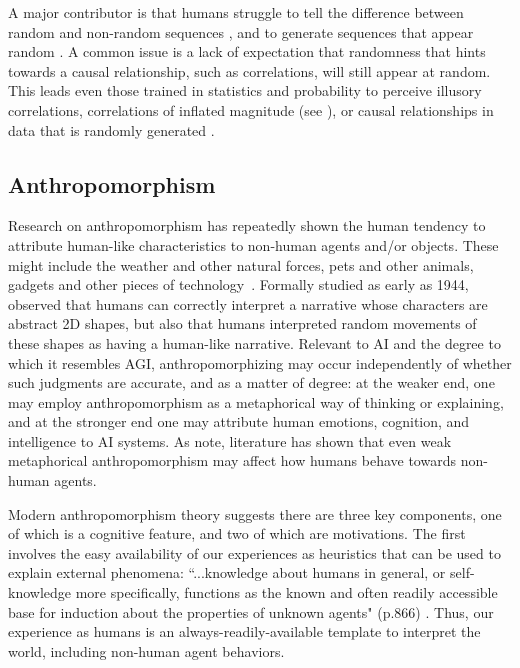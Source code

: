 A major contributor is that humans struggle to tell the difference between random and non-random sequences \citep{falk1997making}, and to generate sequences that appear random \citep{ladouceur1996erroneous}. A common issue is a lack of expectation that randomness that hints towards a causal relationship, such as correlations, will still appear at random. This leads even those trained in statistics and probability to perceive illusory correlations, correlations of inflated magnitude (see \citet{nickerson1998confirmation}), or causal relationships in data that is randomly generated \citep{zgraggen2018investigating}.

\subsection{Anthropomorphism}

Research on anthropomorphism has repeatedly shown the human tendency to attribute human-like characteristics to non-human agents and/or objects. These might include the weather and other natural forces, pets and other animals, gadgets and other pieces of technology~\citep{epley2007seeing}. Formally studied as early as 1944,~\citep{heider1944experimental} observed that humans can correctly interpret a narrative whose characters are abstract 2D shapes, but also that humans interpreted random movements of these shapes as having a human-like narrative. 
Relevant to AI and the degree to which it resembles AGI, anthropomorphizing may occur independently of whether such judgments are accurate, and as a matter of degree: at the weaker end, one may employ anthropomorphism as a metaphorical way of thinking or explaining, and at the stronger end one may attribute human emotions, cognition, and intelligence to AI systems. As \citet{epley2007seeing} note, literature has shown that even weak metaphorical anthropomorphism may affect how humans behave towards non-human agents.

Modern anthropomorphism theory suggests there are three key components, one of which is a cognitive feature, and two of which are motivations. The first involves the easy availability of our experiences as heuristics that can be used to explain external phenomena: ``...knowledge about humans in general, or self-knowledge more specifically, functions as the known and often readily accessible base for induction about the properties of unknown agents" (p.866) \citep{epley2007seeing}. Thus, our experience as humans is an always-readily-available template to interpret the world, including non-human agent behaviors. 

